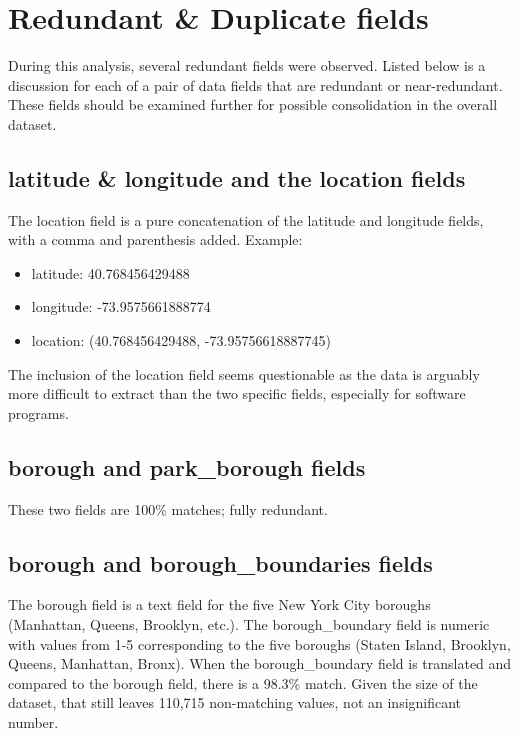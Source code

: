 \documentclass[12pt, titlepage]{article}
\begin{document}
\section{Redundant \& Duplicate fields}\label{sec:duplicates}
During this analysis, several redundant fields were observed. Listed below 
is a discussion for each of a pair of data fields that are redundant or 
near-redundant. These fields should be examined further for 
possible consolidation in the overall dataset.

\subsection{latitude \& longitude and the location fields}
\label{sec:latlong}
The location field is a pure concatenation of the latitude 
and longitude fields, with a comma and parenthesis 
added. Example:  

\begin{itemize}
	\item  latitude: 40.768456429488
	\item  longitude: -73.9575661888774
	\item  location: (40.768456429488, -73.95756618887745)
\end{itemize}

The inclusion of the location field seems questionable as the data is 
arguably more difficult to extract than the two specific fields, especially 
for software programs.

\subsection{borough and park\_borough fields}
\label{sec:parkborough}
These two fields are 100\% matches; fully redundant.

\subsection{borough and borough\_boundaries fields}
\label{sec:boroughboundaries}
The borough field is a text field for the five New York City boroughs (Manhattan, Queens, 
Brooklyn, etc.). The borough\_boundary field is numeric with values 
from 1-5 corresponding to the five boroughs (Staten Island, Brooklyn, 
Queens, Manhattan, Bronx). When the borough\_boundary field is 
translated and compared to the borough field, there is a 
98.3\% match. Given the size of the dataset, that still leaves 
110,715 non-matching values, not an insignificant number.  
\end{document}
